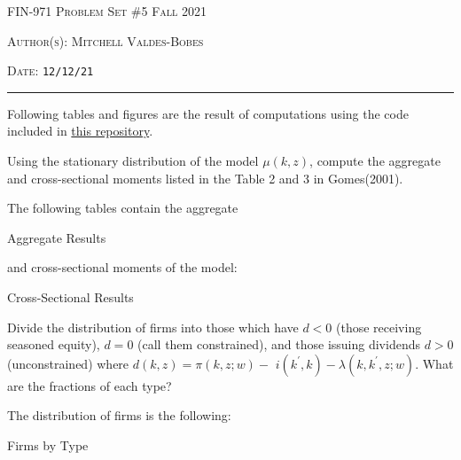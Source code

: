 \documentclass[12pt]{amsart}
\begin{document}
\thispagestyle{empty}


{\scshape FIN-971} \hfill {\scshape \Large Problem Set \#5} \hfill {\scshape Fall 2021}\\
{\scshape Author(s): \hfill Mitchell Valdes-Bobes\\
{\scshape Date: \hfill \texttt{12/12/21}
\medskip

\hrule

\bigskip

\bigskip

Following tables and figures are the result of computations using the code included in \href{https://github.com/mitchv34/FIN-971/tree/main/PS5/code}{this repository}.
\begin{exercise}
    Using the stationary distribution of the model $\mu(k, z)$, compute the aggregate and cross-sectional moments listed in the Table 2 and 3 in Gomes(2001).
\end{exercise}
\begin{answer}
    The following tables contain the aggregate
    \begin{table}[h]\caption{Aggregate Results}
        
    \end{table}
    and cross-sectional moments of the model:
    \begin{table}[h]\caption{Cross-Sectional Results}
        
    \end{table}
\end{answer}

\begin{exercise}
    Divide the distribution of firms into those which have $d<0$ (those receiving seasoned equity), $d=0$ (call them constrained), and those issuing dividends $d>0$ (unconstrained) where $d(k, z)=\pi(k, z ; w)-$ $i\left(k^{\prime}, k\right)-\lambda\left(k, k^{\prime}, z ; w\right)$. What are the fractions of each type?
\end{exercise}

\begin{answer}
The distribution of firms is the following:
\begin{table}[h]\caption{Firms by Type}
    
\end{table}
\end{answer}

\newpage

}}
\end{document}
